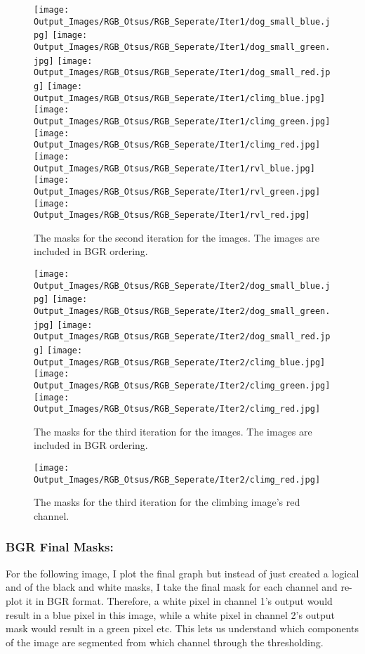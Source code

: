\documentclass{article}
\begin{document}
\begin{figure}[H]
    \centering
    \texttt{[image: Output\_Images/RGB\_Otsus/RGB\_Seperate/Iter1/dog\_small\_blue.jpg]}
    \texttt{[image: Output\_Images/RGB\_Otsus/RGB\_Seperate/Iter1/dog\_small\_green.jpg]}
    \texttt{[image: Output\_Images/RGB\_Otsus/RGB\_Seperate/Iter1/dog\_small\_red.jpg]}
    \texttt{[image: Output\_Images/RGB\_Otsus/RGB\_Seperate/Iter1/climg\_blue.jpg]}
    \texttt{[image: Output\_Images/RGB\_Otsus/RGB\_Seperate/Iter1/climg\_green.jpg]}
    \texttt{[image: Output\_Images/RGB\_Otsus/RGB\_Seperate/Iter1/climg\_red.jpg]}
    \texttt{[image: Output\_Images/RGB\_Otsus/RGB\_Seperate/Iter1/rvl\_blue.jpg]}
    \texttt{[image: Output\_Images/RGB\_Otsus/RGB\_Seperate/Iter1/rvl\_green.jpg]}
    \texttt{[image: Output\_Images/RGB\_Otsus/RGB\_Seperate/Iter1/rvl\_red.jpg]}
    \caption{The masks for the second iteration for the images. The images are included in BGR ordering.}
\end{figure}

\begin{figure}[H]
    \centering
    \texttt{[image: Output\_Images/RGB\_Otsus/RGB\_Seperate/Iter2/dog\_small\_blue.jpg]}
    \texttt{[image: Output\_Images/RGB\_Otsus/RGB\_Seperate/Iter2/dog\_small\_green.jpg]}
    \texttt{[image: Output\_Images/RGB\_Otsus/RGB\_Seperate/Iter2/dog\_small\_red.jpg]}
    \texttt{[image: Output\_Images/RGB\_Otsus/RGB\_Seperate/Iter2/climg\_blue.jpg]}
    \texttt{[image: Output\_Images/RGB\_Otsus/RGB\_Seperate/Iter2/climg\_green.jpg]}
    \texttt{[image: Output\_Images/RGB\_Otsus/RGB\_Seperate/Iter2/climg\_red.jpg]}
    \caption{The masks for the third iteration for the images. The images are included in BGR ordering.}
\end{figure}

\begin{figure}[H]
    \centering
    \texttt{[image: Output\_Images/RGB\_Otsus/RGB\_Seperate/Iter2/climg\_red.jpg]}
    \caption{The masks for the third iteration for the climbing image's red channel.}
\end{figure}

\subsubsection{BGR Final Masks:}
For the following image, I plot the final graph but instead of just created a logical and of the black and white
masks, I take the final mask for each channel and re-plot it in BGR format. Therefore, a white pixel in channel 1's output
would result in a blue pixel in this image, while a white pixel in channel 2's output mask would result in a green pixel etc.
This lets us understand which components of the image are segmented from which channel through the thresholding.
\end{document}
